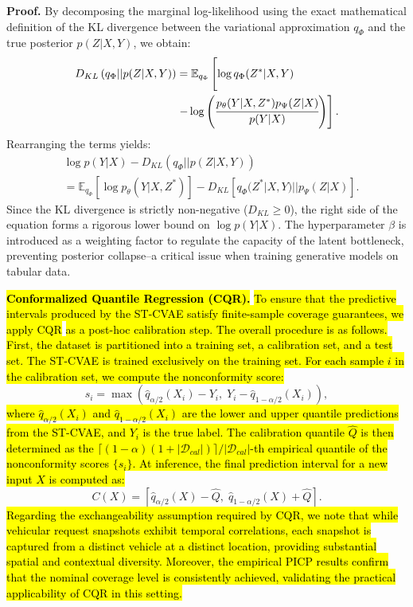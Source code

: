 \documentclass[journal]{IEEEtran}
\begin{document}
\textbf{Proof.}
By decomposing the marginal log-likelihood using the exact mathematical definition of the KL divergence between the variational approximation $q_{\Phi}$ and the true posterior $p(Z|X,Y)$, we obtain:
\begin{equation} \begin{split}
    D_{KL}\left(q_{\Phi}||p(Z|X,Y)\right)&=\mathbb{E}_{q_{\Phi}}\left[\log q_{\Phi}(Z^{*}|X,Y) \cfrac{}{}\right.\\
    & \left. - \log\left( \cfrac{p_{\theta}(Y|X,Z^{{*}})p_{\Psi}(Z|X)}{p(Y|X)} \right) \right].
\end{split}\end{equation}
Rearranging the terms yields:
\begin{equation}\begin{split}
    &\log p(Y|X) - D_{KL}\left(q_{\Phi}||p(Z|X,Y)\right) \\
    & = \mathbb{E}_{q_{\Phi}}\left[ \log p_{\theta}(Y|X,Z^{*}) \right] - D_{KL}[q_{\Phi}(Z^{*}|X,Y)||p_{\Psi}(Z|X)].
\end{split}\end{equation}
Since the KL divergence is strictly non-negative ($D_{KL}\ge 0$), the right side of the equation forms a rigorous lower bound on $\log p(Y|X)$.
The hyperparameter $\beta$ is introduced as a weighting factor to regulate the capacity of the latent bottleneck, preventing posterior collapse--a critical issue when training generative models on tabular data.

\hl{\textbf{Conformalized Quantile Regression (CQR).}}
\hl{To ensure that the predictive intervals produced by the ST-CVAE satisfy finite-sample coverage guarantees, we apply CQR} \cite{x11} \hl{as a post-hoc calibration step. The overall procedure is as follows. First, the dataset is partitioned into a training set, a calibration set, and a test set. The ST-CVAE is trained exclusively on the training set. For each sample $i$ in the calibration set, we compute the nonconformity score:}
\begin{equation}
    s_i = \max\left(\hat{q}_{\alpha/2}(X_i) - Y_i,\; Y_i - \hat{q}_{1-\alpha/2}(X_i)\right),
\end{equation}
\hl{where $\hat{q}_{\alpha/2}(X_i)$ and $\hat{q}_{1-\alpha/2}(X_i)$ are the lower and upper quantile predictions from the ST-CVAE, and $Y_i$ is the true label. The calibration quantile $\hat{Q}$ is then determined as the $\lceil(1-\alpha)(1+|\mathcal{D}_{cal}|)\rceil / |\mathcal{D}_{cal}|$-th empirical quantile of the nonconformity scores $\{s_i\}$. At inference, the final prediction interval for a new input $X$ is computed as:}
\begin{equation}
    C(X) = \left[\hat{q}_{\alpha/2}(X) - \hat{Q},\; \hat{q}_{1-\alpha/2}(X) + \hat{Q}\right].
\end{equation}
\hl{Regarding the exchangeability assumption required by CQR, we note that while vehicular request snapshots exhibit temporal correlations, each snapshot is captured from a distinct vehicle at a distinct location, providing substantial spatial and contextual diversity. Moreover, the empirical PICP results confirm that the nominal coverage level is consistently achieved, validating the practical applicability of CQR in this setting.}
\end{document}
